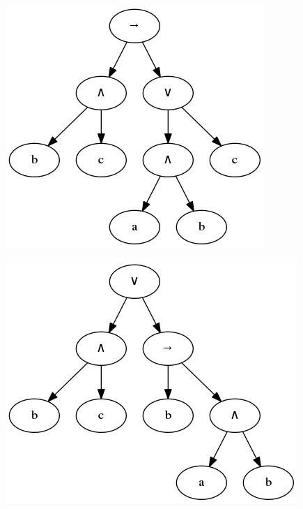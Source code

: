 \documentclass[12pt,fleqn]{article}
\begin{document}
\begin{figure}[!h]
  \centering
    \includegraphics[scale=0.45]{t3.png}
\end{figure}

\begin{figure}[!h]
  \centering
    \includegraphics[scale=0.45]{t4.png}
\end{figure}
\end{document}
